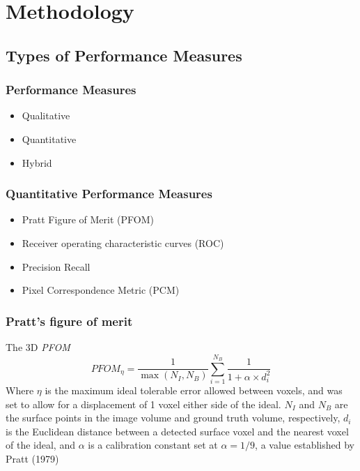 \documentclass[9pt]{beamer}
\begin{document}
	
\section{Methodology}

	\subsection{Types of Performance Measures}
		\begin{frame}
				\frametitle{Performance Measures}
			 			\begin{itemize}
			 			\item Qualitative 
			 			\item Quantitative
			 			\item Hybrid
			 			
			 			\end{itemize}
	\end{frame}		
		\begin{frame}
				\frametitle{Quantitative Performance Measures}
			 			\begin{itemize}
			 			\item Pratt Figure of Merit (PFOM)
			 			\item Receiver operating characteristic curves (ROC)
			 			\item Precision Recall
			 			\item Pixel Correspondence Metric (PCM)
			 			\end{itemize}
	\end{frame}
	\begin{frame}
	\frametitle{Pratt's figure of merit}
	The 3D \emph{PFOM} 
			\begin{equation}
				PFOM_{\eta} = \frac{1}{\max(N_{I}, N_{B})} \sum_{i=1}^{N_{B}}\frac{1}{1+\alpha \times d_{i}^{2}}
				\label{eq3DPFOM}
			\end{equation}
	Where $\eta$ is the maximum ideal tolerable error allowed between voxels, and was set to allow for a displacement of 1 voxel either side of the ideal. $N_{I}$ and $N_{B}$ are the surface points in the image volume and ground truth volume, respectively, $d_{i}$ is the Euclidean distance between a detected surface voxel and the nearest voxel of the ideal, and $\alpha$ is a calibration constant set at $\alpha = 1/9$, a value established by Pratt (1979)
	\end{frame}
\end{document}
